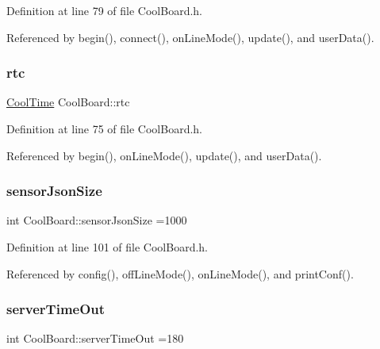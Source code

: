 Definition at line 79 of file Cool\+Board.\+h.



Referenced by begin(), connect(), on\+Line\+Mode(), update(), and user\+Data().

\mbox{\label{classCoolBoard_a50d2a6716879d64a85f3c6b44ad63275}} 
\subsubsection{\texorpdfstring{rtc}{rtc}}
{\footnotesize\ttfamily \hyperlink{classCoolTime}{Cool\+Time} Cool\+Board\+::rtc\hspace{0.3cm}{\ttfamily [private]}}



Definition at line 75 of file Cool\+Board.\+h.



Referenced by begin(), on\+Line\+Mode(), update(), and user\+Data().

\mbox{\label{classCoolBoard_a58e4b6072e3ac8b141ec0befb479208e}} 
\subsubsection{\texorpdfstring{sensor\+Json\+Size}{sensorJsonSize}}
{\footnotesize\ttfamily int Cool\+Board\+::sensor\+Json\+Size =1000\hspace{0.3cm}{\ttfamily [private]}}



Definition at line 101 of file Cool\+Board.\+h.



Referenced by config(), off\+Line\+Mode(), on\+Line\+Mode(), and print\+Conf().

\mbox{\label{classCoolBoard_a7a8d8d3d316220cdd049cd63c1aa8fe6}} 
\subsubsection{\texorpdfstring{server\+Time\+Out}{serverTimeOut}}
{\footnotesize\ttfamily int Cool\+Board\+::server\+Time\+Out =180\hspace{0.3cm}{\ttfamily [private]}}



